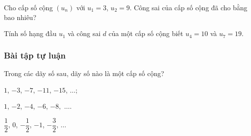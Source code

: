 \begin{vd}[TH]%
	Cho cấp số cộng $(u_n)$ với $u_1=3$, $u_2=9$. Công sai của cấp số cộng đã cho bằng bao nhiêu?
\end{vd}
\begin{vd}[VD]%
	Tính số hạng đầu $u_1$ và công sai $d$ của một cấp số cộng biết $u_4=10$ và $u_7=19$.
\end{vd}
\subsubsection{Bài tập tự luận}
 

\begin{bt}[NB]%
	Trong các dãy số sau, dãy số nào là một cấp số cộng?
	\begin{listEX}[1]
		\item $1$, $-3$, $-7$, $-11$, $-15$, $\ldots$;
		\item $1$, $-2$, $-4$, $-6$, $-8,$ $\ldots$.
		\item $ \dfrac{1}{2} $, $0$, $-\dfrac{1}{2}$, $-1$, $-\dfrac{3}{2}$, $\ldots$
	\end{listEX}
\end{bt}

